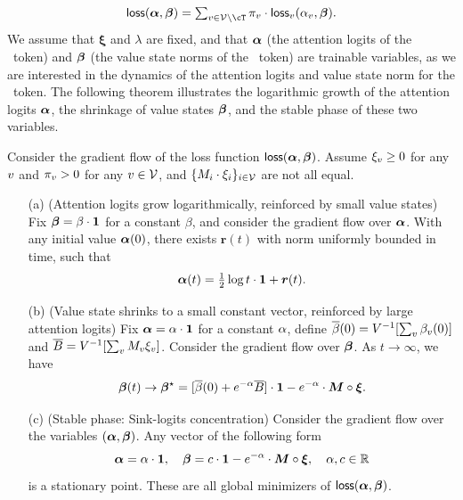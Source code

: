 \begin{equation}\label{eqn:total_loss}
\textstyle \loss(\vecsink,\vecvalue) = \sum_{\tok \in \vocab \setminus \cT} \stable_\tok \cdot \loss_\tok(\sink_\tok, \vecvalue).
\end{equation}
We assume that $\bm{\xi}$ and $\lambda$ are fixed, and that $\bm{\alpha}$ (the attention logits of the \bos~token) and $\boldsymbol{\beta}$ (the value state norms of the \bos~token) are trainable variables, as we are interested in the dynamics of the attention logits and value state norm for the \bos~token. The following theorem illustrates the logarithmic growth of the attention logits $\bm{\alpha}$, the shrinkage of value states $\boldsymbol{\beta}$, and the stable phase of these two variables.
\begin{theorem}\label{thm:main}
Consider the gradient flow of the loss function $\mathsf{loss}(\bm{\alpha}, \boldsymbol{\beta})$. Assume $\xi_v \ge 0$ for any $v$ and $\pi_v > 0$ for any $v\in\mathcal{V}$, and $\{ M_i \cdot \xi_i \}_{i \in \mathcal{V}}$ are not all equal. 
\begin{itemize}[leftmargin=2em]
\setlength\itemsep{0pt}
    \item[\textup{(a)}] (Attention logits grow logarithmically, reinforced by small value states) Fix $\boldsymbol{\beta}= \beta \cdot \bm{1}$ for a constant $\beta$, and consider the gradient flow over $\bm{\alpha}$. With any initial value $\bm{\alpha}(0)$, there exists $\bm{r}(t)$ with norm uniformly bounded in time, such that 
    \begin{equation}
    \textstyle \bm{\alpha}(t) = \frac{1}{2} \log t \cdot \bm{1} + \bm{r}(t).\end{equation}
    \item[\textup{(b)}] (Value state shrinks to a small constant vector, reinforced by large attention logits) Fix $\bm{\alpha} = \alpha \cdot \bm{1}$ for a constant $\alpha$, define $\overline{\beta}(0) = V^{-1}[\sum_{v} \beta_v(0)]$ and $\overline{B}=V^{-1}[\sum_{v} M_v \xi_v]$. Consider the gradient flow over $\boldsymbol{\beta}$. As $t \to \infty$, we have
    \begin{equation}\boldsymbol{\beta}(t) \to \boldsymbol{\beta}^\star = [\overline{\beta}(0)+e^{-\alpha} \overline{B}] \cdot \bm{1} - e^{-\alpha} \cdot \bm{M}\circ \bm{\xi}.\end{equation}
    \item[\textup{(c)}] (Stable phase: Sink-logits concentration) Consider the gradient flow over the variables $(\bm{\alpha}, \boldsymbol{\beta})$. Any vector of the following form
    \begin{equation}\bm{\alpha} = \alpha \cdot \bm{1}, \quad \boldsymbol{\beta} = c \cdot \bm{1} - e^{-\alpha} \cdot \bm{M} \circ \bm{\xi},  ~~~ \alpha, c\in\mathbb{R} \end{equation}
     is a stationary point. These are all global minimizers of $\mathsf{loss}(\bm{\alpha},\boldsymbol{\beta})$.
\end{itemize}
\end{theorem}
